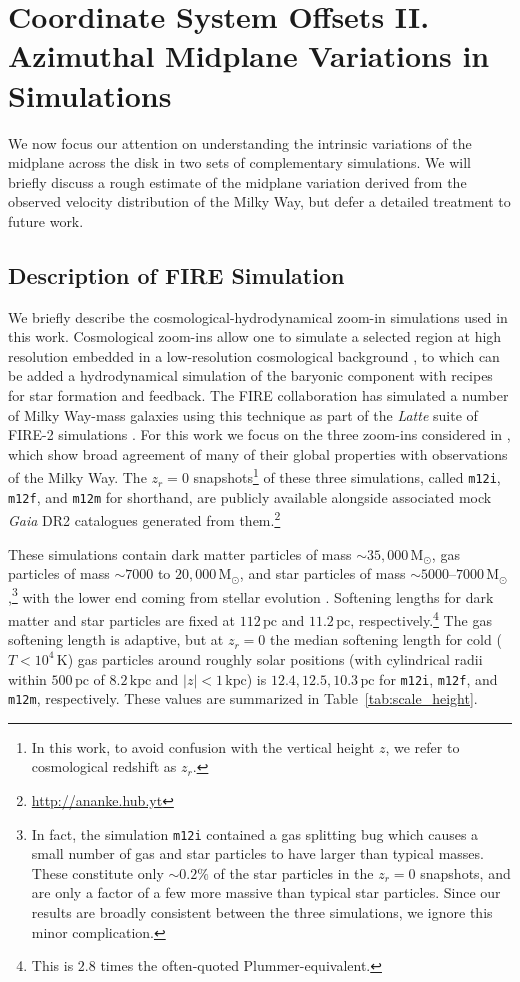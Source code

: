\documentclass[twocolumn]{aastex62}
\newcommand{\Msun}{\ensuremath{\text{M}_\odot}}
\newcommand{\pc}{\text{pc}}
\newcommand{\kpc}{\text{kpc}}
\newcommand{\mi}{\texttt{m12i}}
\newcommand{\mf}{\texttt{m12f}}
\newcommand{\mm}{\texttt{m12m}}
\newcommand{\abs}[1]{\left| #1 \right|}
\newcommand{\z}{z_r}
\begin{document}
\section{Coordinate System Offsets II. Azimuthal Midplane Variations in
Simulations}
\label{sec:local_fire}

We now focus our attention on understanding the intrinsic variations of the
midplane across the disk in two sets of complementary simulations. We will
briefly discuss a rough estimate of the midplane variation derived from the
observed velocity distribution of the Milky Way, but defer a detailed
treatment to future work.

\subsection{Description of FIRE Simulation} \label{ssec:cosmozoom}
We briefly describe the cosmological-hydrodynamical zoom-in simulations used
in this work. Cosmological zoom-ins allow one to simulate a selected region at
high resolution embedded in a low-resolution cosmological background
\citep[e.g.][]{1993ApJ...412..455K,2014MNRAS.437.1894O}, to which can be added
a hydrodynamical simulation of the baryonic component with recipes for star
formation and feedback. The FIRE collaboration has simulated a number of Milky
Way-mass galaxies using this technique as part of the {\em Latte} suite of
FIRE-2 simulations \citep{2016ApJ...827L..23W,2018MNRAS.481.4133G}. For this
work we focus on the three zoom-ins considered in \citet{2018arXiv180610564S},
which show broad agreement of many of their global properties with
observations of the Milky Way. The $\z=0$ snapshots\footnote{In this work, to
avoid confusion with the vertical height $z$, we refer to cosmological
redshift as $\z$.} of these three simulations, called \mi{}, \mf{}, and \mm{}
for shorthand, are publicly available alongside associated mock {\em Gaia} DR2
catalogues generated from them.\footnote{\url{http://ananke.hub.yt}}

These simulations contain dark matter particles of mass $\sim35,000\,\Msun$,
gas particles of mass $\sim 7000$ to $20,000\,\Msun$, and star particles
of mass $\sim 5000 \text{--} 7000\,
\Msun$,\footnote{In fact, the simulation \mi{} contained a gas
splitting bug which causes a small number of gas and star particles to have
larger than typical masses. These constitute only $\sim0.2\%$ of the star
particles in the $\z=0$ snapshots, and are only a factor of a few more massive
than typical star particles. Since our results are broadly consistent between
the three simulations, we ignore this minor complication.} with the lower end
coming from stellar evolution \citep{2018arXiv180610564S}. Softening lengths
for dark matter and star particles are fixed at $112\,\pc$ and $11.2\,\pc$,
respectively.\footnote{This is $2.8$ times the often-quoted
Plummer-equivalent.} The gas softening length is adaptive, but at $\z=0$ the
median softening length for cold ($T < 10^4\,\text{K}$) gas particles around
roughly solar positions (with cylindrical radii within $500\,\pc$ of
$8.2\,\kpc$ and $\abs{z}<1\,\kpc$) is $12.4, 12.5, 10.3\,\pc$ for \mi{},
\mf{}, and \mm{}, respectively. These values are summarized in
Table~\ref{tab:scale_height}.
\end{document}
